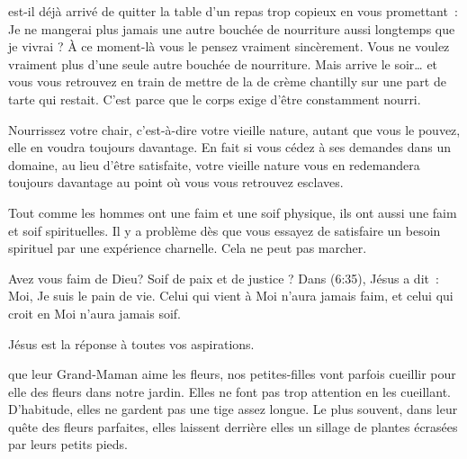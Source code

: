 
 est-il déjà arrivé de quitter la table d'un repas
 trop copieux en vous promettant~:
 \og Je ne mangerai plus jamais une autre bouchée de nourriture aussi longtemps
 que je vivrai \fg{} ?
 \`A ce moment-là vous le pensez vraiment sincèrement.
 Vous ne voulez vraiment plus d'une seule autre bouchée de nourriture.
 Mais arrive le soir\dots{} et vous vous retrouvez en train de mettre
 de la de crème chantilly sur une part de tarte qui restait.
 C'est parce que le corps exige d'être constamment nourri.


Nourrissez votre chair, c'est-à-dire votre vieille nature,
 autant que vous le pouvez, elle en voudra toujours davantage.
 En fait si vous cédez à ses demandes dans un domaine,
 au lieu d'être satisfaite, votre vieille nature vous en redemandera
 toujours davantage au point où vous vous retrouvez esclaves.

Tout comme les hommes ont une faim et une soif physique,
 ils ont aussi une faim et soif spirituelles.
 Il y a problème dès que vous essayez de satisfaire un besoin spirituel
 par une expérience charnelle. Cela ne peut pas marcher.

Avez vous faim de Dieu? Soif de paix et de justice ?
 Dans (6:35), Jésus a dit~:
 \og Moi, Je suis le pain de vie. Celui qui vient à Moi n'aura jamais faim,
 et celui qui croit en Moi n'aura jamais soif. \fg{}

Jésus est la réponse à toutes vos aspirations. 

\dvrule






 que leur Grand-Maman aime les fleurs, nos petites-filles
 vont parfois cueillir pour elle des fleurs dans notre jardin.
 Elles ne font pas trop attention en les cueillant.
 D'habitude, elles ne gardent pas une tige assez longue.
 Le plus souvent, dans leur quête des fleurs parfaites, elles laissent derrière
 elles un sillage de plantes écrasées par leurs petits pieds.

